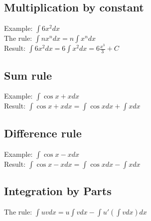 \documentclass[a4paper, 10pt]{article}
\begin{document}
\subsection{Multiplication by constant}
Example: $\int 6x^2 dx$\\
The rule: $\int nx^n dx = n \int x^n dx$\\
Result: $\int 6x^2 dx = 6 \int x^2 dx = 6 \frac{x^3}{3} + C$\\ 

\subsection{Sum rule}
Example: $\int \cos x + x dx$\\
Result: $\int \cos x + x dx = \int \cos x dx + \int x dx$\\

\subsection{Difference rule}
Example: $\int \cos x - x dx$\\
Result: $\int \cos x - x dx = \int \cos x dx - \int x dx$\\

\subsection{Integration by Parts}
The rule: $\int u v dx = u \int v dx - \int u' (\int v dx) dx$
\end{document}
